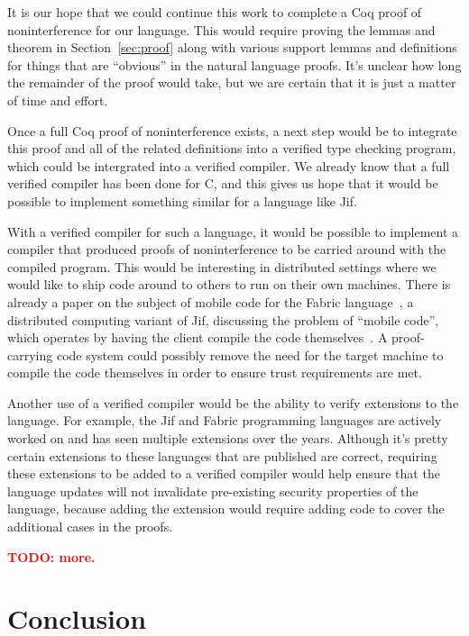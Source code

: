 \documentclass[a4paper,twocolumn]{article}
\newcommand{\todo}[1]{\textbf{\textcolor{red}{TODO: #1}}}
\theoremstyle{plain}
\theoremstyle{definition}
\begin{document}
It is our hope that we could continue this work to complete a Coq proof of
noninterference for our language.  This would require proving the lemmas and
theorem in Section~\ref{sec:proof} along with various support lemmas and
definitions for things that are ``obvious'' in the natural language proofs.
It's unclear how long the remainder of the proof would take, but we are certain
that it is just a matter of time and effort.

Once a full Coq proof of noninterference exists, a next step would be to
integrate this proof and all of the related definitions into a verified type
checking program, which could be intergrated into a verified compiler.  We
already know that a full verified compiler has been done for C, and this gives
us hope that it would be possible to implement something similar for a language
like Jif.

With a verified compiler for such a language, it would be possible to implement
a compiler that produced proofs of noninterference to be carried around with the
compiled program.  This would be interesting in distributed settings where we
would like to ship code around to others to run on their own machines.  There is
already a paper on the subject of mobile code for the Fabric
language~\cite{liu2009fabric}, a distributed computing variant of Jif,
discussing the problem of ``mobile code'', which operates by having the client
compile the code themselves~\cite{arden2012sharing}.  A proof-carrying code
system could possibly remove the need for the target machine to compile the code
themselves in order to ensure trust requirements are met.

Another use of a verified compiler would be the ability to verify extensions to
the language.  For example, the Jif and Fabric programming languages are
actively worked on and has seen multiple extensions over the years.  Although
it's pretty certain extensions to these languages that are published are
correct, requiring these extensions to be added to a verified compiler would
help ensure that the language updates will not invalidate pre-existing security
properties of the language, because adding the extension would require adding
code to cover the additional cases in the proofs.

\todo{more.}

\section{Conclusion}
\label{sec:conclusion}
\end{document}

